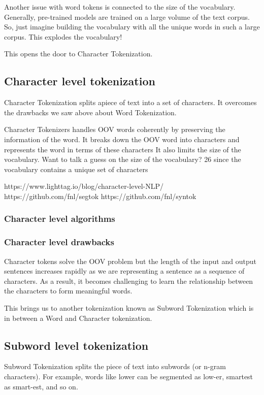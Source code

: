 Another issue with word tokens is connected to the size of the vocabulary. Generally, pre-trained models are trained on a large volume of the text corpus. So, just imagine building the vocabulary with all the unique words in such a large corpus. This explodes the vocabulary!

This opens the door to Character Tokenization.
    
\subsection{Character level tokenization}

Character Tokenization splits apiece of text into a set of characters. It overcomes the drawbacks we saw above about Word Tokenization.

    Character Tokenizers handles OOV words coherently by preserving the information of the word. It breaks down the OOV word into characters and represents the word in terms of these characters
    It also limits the size of the vocabulary. Want to talk a guess on the size of the vocabulary? 26 since the vocabulary contains a unique set of characters

https://www.lighttag.io/blog/character-level-NLP/
https://github.com/fnl/segtok
https://github.com/fnl/syntok

\subsubsection{Character level algorithms}

\subsubsection{Character level drawbacks}

Character tokens solve the OOV problem but the length of the input and output sentences increases rapidly as we are representing a sentence as a sequence of characters. As a result, it becomes challenging to learn the relationship between the characters to form meaningful words.

This brings us to another tokenization known as Subword Tokenization which is in between a Word and Character tokenization.

\subsection{Subword level tokenization}

Subword Tokenization splits the piece of text into subwords (or n-gram characters). For example, words like lower can be segmented as low-er, smartest as smart-est, and so on.

